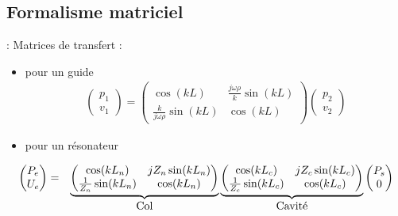 \documentclass[12pt,xcolor=x11names,compress, notes=show]{beamer}%
\begin{document}
\subsection{Formalisme matriciel}
\begin{frame}{\insertsectionhead : \insertsubsectionhead }
Matrices de transfert : 
\begin{itemize}
	\item pour un guide 
	\begin{eqnarray*}
	\begin{pmatrix} p_1 \\ v_1 \end{pmatrix} = \begin{pmatrix} \cos(kL) & \frac{j\omega\rho}{k} \sin(k L) \\  \frac{k}{j\omega\rho}\sin(k L) & \cos(k L) 		\end{pmatrix} 	\begin{pmatrix} p_2 \\ v_2 \end{pmatrix}
	\end{eqnarray*}
	
	\item pour un résonateur
\end{itemize}

\begin{footnotesize}
		\begin{eqnarray*}
\begin{pmatrix} P_e \\U_e \end{pmatrix}&=&\underbrace{
				\begin{pmatrix} \cos(k L_n) & j Z_{n} \sin(k L_n) \\ \frac{1}{Z_{n}} \sin(k L_n) & \cos(k L_n) \end{pmatrix}}_{\text{\normalsize Col}}
				\underbrace{\begin{pmatrix} \cos(k L_c) & j Z_{c} \sin(k L_c) \\ \frac{1}{Z_{c}} \sin(kL_c) & \cos(k L_c) \end{pmatrix}}_{\text{\normalsize Cavité}}
				 \begin{pmatrix} P_s \\ 0  \end{pmatrix}
		\end{eqnarray*}
\end{footnotesize}

\end{frame}
\end{document}
